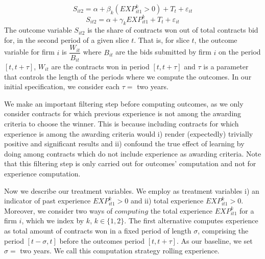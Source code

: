 \begin{equation}
  \label{eqn:olsspec1}
S_{it2}=\alpha+ \beta_{k} (EXP^k_{it1}>0)+T_t+\varepsilon_{it}
\end{equation}
\begin{equation}
\label{eqn:olsspec2}
S_{it2}=\alpha+ \gamma_{k} EXP^k_{it1}+T_t+\varepsilon_{it}
\end{equation}
The outcome variable $S_{it2}$ is the share of contracts won out of total contracts bid for, in the second period of a given slice $t$. That is, for slice $t$, the outcome variable for firm $i$ is $\dfrac{W_{it}}{B_{it}}$ where $B_{it}$ are the bids submitted by firm $i$ on the period $[t,t+\tau]$, $W_{it}$ are the contracts won in period $[t,t+\tau]$ and $\tau$ is a parameter that controls the length of the periods where we compute the outcomes. In our initial specification, we consider each $\tau=$ two years. %

We make an important filtering step before computing outcomes, as we only consider contracts for which previous experience is not among the awarding criteria to choose the winner. This is because including contracts for which experience is among the awarding criteria would i) render (expectedly) trivially positive and significant results and ii) confound the true effect of learning by doing among contracts which do not include experience as awarding criteria. Note that this filtering step is only carried out for outcomes' computation and not for experience computation.


Now we describe our treatment variables. We employ as treatment variables  i) an indicator of past experience $EXP^k_{it1}>0$ and ii) total experience $EXP^k_{it1}>0$. Moreover, we consider two ways of $computing$ the total experience $EXP^k_{it1}$ for a firm $i$, which we index by $k$, $k\in \{1,2\}$. The first alternative computes experience as total amount of contracts won in a fixed period of length $\sigma$, comprising the period $[t-\sigma,t]$ before the outcomes period $[t,t+\tau]$. As our baseline, we set $\sigma=$ two years. We call this computation strategy rolling experience.

